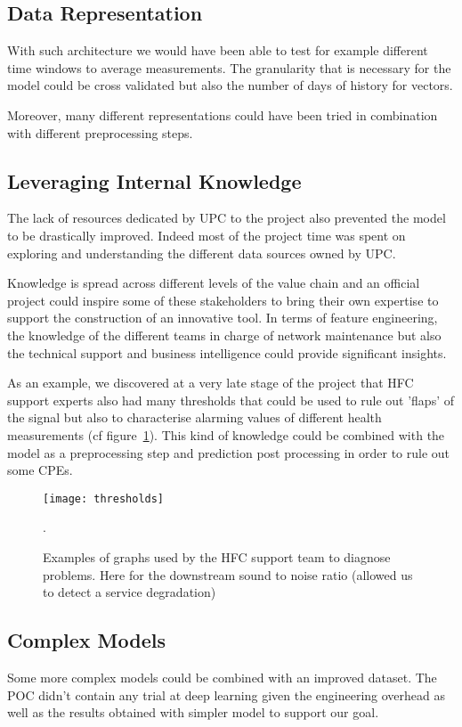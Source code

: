 \subsection{Data Representation}
With such architecture we would have been able to test for example different time windows to average measurements. The granularity that is necessary for the model could be cross validated but also the number of days of history for vectors. 

Moreover, many different representations could have been tried in combination with different preprocessing steps. 

\subsection{Leveraging Internal Knowledge}
The lack of resources dedicated by UPC to the project also prevented the model to be drastically improved. Indeed most of the project time was spent on exploring and understanding the different data sources owned by UPC. 

Knowledge is spread across different levels of the value chain and an official project could inspire some of these stakeholders to bring their own expertise to support the construction of an innovative tool. In terms of feature engineering, the knowledge of the different teams in charge of network maintenance but also the technical support and business intelligence could provide significant insights.

As an example, we discovered at a very late stage of the project that HFC support experts also had many thresholds that could be used to rule out 'flaps' of the signal but also to characterise alarming values of different health measurements (cf figure~\ref{thresholds}). This kind of knowledge could be combined with the model as a preprocessing step and prediction post processing in order to rule out some CPEs. 

\begin{figure}[ht]
    \begin{center}
    \texttt{[image: thresholds]}
    \end{center}
    \caption{Examples of graphs used by the HFC support team to diagnose problems. Here for the downstream sound to noise ratio (allowed us to detect a service degradation)}.
    \label{thresholds}
\end{figure}

\subsection{Complex Models}
Some more complex models could be combined with an improved dataset. The POC didn't contain any trial at deep learning given the engineering overhead as well as the results obtained with simpler model to support our goal.

